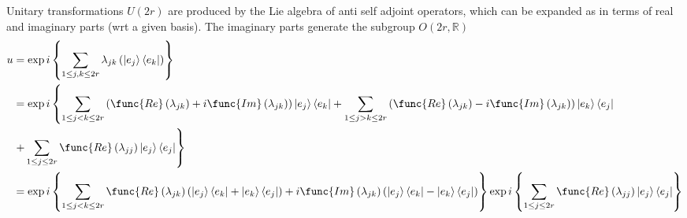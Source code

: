 \documentclass[aps,preprint]{revtex4}
\begin{document}
Unitary transformations $U\left( 2r\right) $ are produced by the Lie algebra
of anti self adjoint operators, which can be expanded as in terms of real
and imaginary parts (wrt a given basis). The imaginary parts generate the
subgroup $O\left( 2r,\mathbb{R}\right) $ 
\begin{align}
u & =\exp i\left\{ \sum_{1\leq j,k\leq2r}\lambda_{jk}\left( \left\vert
e_{j}\right\rangle \left\langle e_{k}\right\vert \right) \right\} \\
& =\exp i\left\{ \sum_{1\leq j<k\leq2r}\left( \func{Re}\left(
\lambda_{jk}\right) +i\func{Im}\left( \lambda_{jk}\right) \right) \left\vert
e_{j}\right\rangle \left\langle e_{k}\right\vert +\sum_{1\leq
j>k\leq2r}\left( \func{Re}\left( \lambda_{jk}\right) -i\func{Im}\left(
\lambda_{jk}\right) \right) \left\vert e_{k}\right\rangle \left\langle
e_{j}\right\vert \right. \\
& \left. +\sum_{1\leq j\leq2r}\func{Re}\left( \lambda_{jj}\right) \left\vert
e_{j}\right\rangle \left\langle e_{j}\right\vert \right\} \\
& =\exp i\left\{ \sum_{1\leq j<k\leq2r}\func{Re}\left( \lambda _{jk}\right)
\left( \left\vert e_{j}\right\rangle \left\langle e_{k}\right\vert
+\left\vert e_{k}\right\rangle \left\langle e_{j}\right\vert \right) +i\func{%
Im}\left( \lambda_{jk}\right) \left( \left\vert e_{j}\right\rangle
\left\langle e_{k}\right\vert -\left\vert e_{k}\right\rangle \left\langle
e_{j}\right\vert \right) \right\} \exp i\left\{ \sum_{1\leq j\leq2r}\func{Re}%
\left( \lambda_{jj}\right) \left\vert e_{j}\right\rangle \left\langle
e_{j}\right\vert \right\}
\end{align}%
\end{document}
